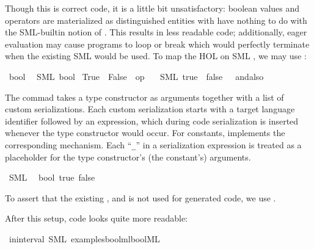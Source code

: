 \begin{isabellebody}
\begin{isamarkuptext}
  Though this is correct code, it is a little bit unsatisfactory:
  boolean values and operators are materialized as distinguished
  entities with have nothing to do with the SML-builtin notion
  of .  This results in less readable code;
  additionally, eager evaluation may cause programs to
  loop or break which would perfectly terminate when
  the existing SML  would be used.  To map
  the HOL  on SML , we may use
  :%
\end{isamarkuptext}%
\isamarkuptrue%
%
\isadelimtt
%
\endisadelimtt
%
\isatagtt
{}\isamarkupfalse%
\ bool\isanewline
\ \ {\isacharparenleft}SML\ {\isachardoublequoteopen}bool{\isachardoublequoteclose}{\isacharparenright}\isanewline
{}\isamarkupfalse%
\ True\ \ False\ \ {\isachardoublequoteopen}op\ {\isasymand}{\isachardoublequoteclose}\isanewline
\ \ {\isacharparenleft}SML\ {\isachardoublequoteopen}true{\isachardoublequoteclose}\ \ {\isachardoublequoteopen}false{\isachardoublequoteclose}\ \ {\isachardoublequoteopen}{\isacharunderscore}\ andalso\ {\isacharunderscore}{\isachardoublequoteclose}{\isacharparenright}%
\endisatagtt
{\isafoldtt}%
%
\isadelimtt
%
\endisadelimtt
%
\begin{isamarkuptext}%
The \isa{{\isasymCODETYPE}} commad takes a type constructor
  as arguments together with a list of custom serializations.
  Each custom serialization starts with a target language
  identifier followed by an expression, which during
  code serialization is inserted whenever the type constructor
  would occur.  For constants, \isa{{\isasymCODECONST}} implements
  the corresponding mechanism.  Each ``\verb|_|'' in
  a serialization expression is treated as a placeholder
  for the type constructor's (the constant's) arguments.%
\end{isamarkuptext}%
\isamarkuptrue%
\isamarkupfalse%
\ SML\isanewline
\ \ bool\ true\ false%
\begin{isamarkuptext}%
To assert that the existing ,  and 
  is not used for generated code, we use \isa{{\isasymCODERESERVED}}.

  After this setup, code looks quite more readable:%
\end{isamarkuptext}%
\isamarkuptrue%
\isamarkupfalse%
\ in{\isacharunderscore}interval\ {\isacharparenleft}SML\ {\isachardoublequoteopen}examples{\isacharslash}bool{\isacharunderscore}mlbool{\isachardot}ML{\isachardoublequoteclose}{\isacharparenright}%
\begin{isamarkuptext}%


\end{isamarkuptext}
\end{isabellebody}
